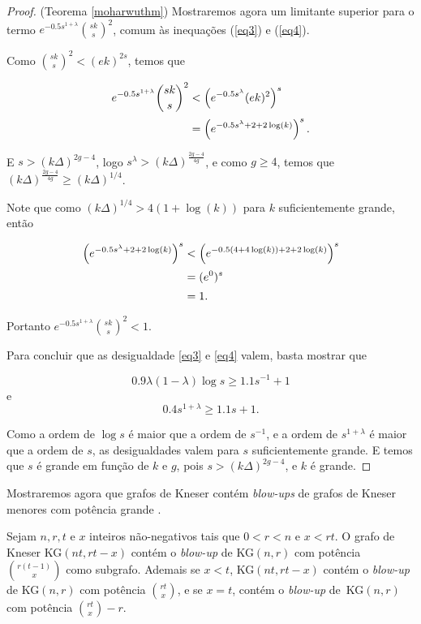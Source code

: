 \begin{proof}{(Teorema \ref{moharwuthm})}
Mostraremos agora um limitante superior para o termo $e^{-0.5s^{1+\lambda}}\binom{sk}{s}^2$, comum às inequações (\ref{eq3}) e (\ref{eq4}).

Como $\binom{sk}{s}^2 < (ek)^{2s}$, temos que

\begin{equation*}
\setlength{\jot}{5pt}
\begin{aligned}
e^{-0.5s^{1+\lambda}}\binom{sk}{s}^2 &< \left(e^{-0.5s^{\lambda}}(ek)^2\right)^s\\
&= \left(e^{-0.5s^\lambda + 2 + 2\log(k)}\right)^s.
\end{aligned}
\end{equation*}

E $s > (k\Delta)^{2g-4}$, logo $s^\lambda > (k\Delta)^{\frac{2g-4}{4g}}$, e como $g \geq 4$, temos que $(k\Delta)^{\frac{2g-4}{4g}} \geq (k\Delta)^{1/4}$. 

Note que como $(k\Delta)^{1/4} > 4(1+\log(k))$ para $k$ suficientemente grande, então

\begin{equation*}
\setlength{\jot}{5pt}
\begin{aligned}
\left(e^{-0.5s^\lambda + 2 + 2\log(k)}\right)^s &< \left(e^{-0.5(4+4\log(k)) + 2 + 2\log(k)}\right)^s\\ 
&= (e^0)^s \\
&= 1.
\end{aligned}
\end{equation*}

Portanto $e^{-0.5s^{1+\lambda}}\binom{sk}{s}^2 < 1$.

Para concluir que as desigualdade \ref{eq3} e \ref{eq4} valem, basta mostrar que

\[0.9\lambda(1-\lambda)\log s \geq 1.1s^{-1} + 1\]
e
\[0.4s^{1+\lambda}\geq 1.1s + 1.\]

Como a ordem de $\log s$ é maior que a ordem de $s^{-1}$, e a ordem de $s^{1+\lambda}$ é maior que a ordem de $s$, as desigualdades valem para $s$ suficientemente grande. E temos que $s$ é grande em função de $k$ e $g$, pois $s > (k\Delta)^{2g-4}$, e $k$ é grande.
\end{proof}

Mostraremos agora que grafos de Kneser contém \textit{blow-ups} de grafos de Kneser menores com potência grande \cite{mohar2016dichromatic}.

\begin{teorema}[Mohar e Wu, 2016]\label{moharwukn}
Sejam $n,r,t$ e $x$ inteiros não-negativos tais que $0 < r < n$ e $x < rt$. O grafo de Kneser KG$(nt, rt-x)$ contém o \textit{blow-up} de KG$(n,r)$ com potência $\binom{r(t-1)}{x}$ como subgrafo. Ademais se $x < t$, KG$(nt, rt-x)$ contém o \textit{blow-up} de KG$(n,r)$ com potência $\binom{rt}{x}$, e se $x = t$, contém o \textit{blow-up} de~KG$(n,r)$ com potência $\binom{rt}{x}-r$.
\end{teorema}

